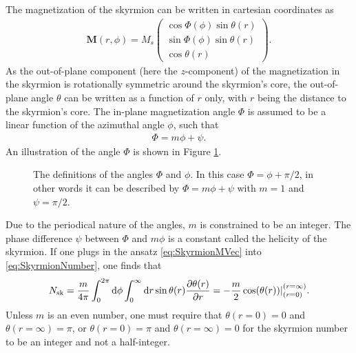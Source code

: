 The magnetization of the skyrmion can be written in cartesian coordinates as
\begin{align}
\label{eq:SkyrmionMVec}
\mathbold{M}(r, \phi) = M_s
\begin{pmatrix}
\cos\Phi(\phi)\sin\theta(r) \\ \sin\Phi(\phi)\sin\theta(r) \\ \cos\theta(r)
\end{pmatrix}.
\end{align}
As the out-of-plane component (here the $z$-component) of the magnetization in the skyrmion is rotationally symmetric around the skyrmion's core, the out-of-plane angle $\theta$ can be written as a function of $r$ only, with $r$ being the distance to the skyrmion's core. The in-plane magnetization angle $\Phi$ is assumed to be a linear function of the azimuthal angle $\phi$, such that
\begin{align}
\Phi = m\phi + \psi.
\end{align}
An illustration of the angle $\Phi$ is shown in Figure \ref{fig:PhiFig}.
\begin{figure}[h!]
\centering
  \centering
\caption{The definitions of the angles $\Phi$ and $\phi$. In this case $\Phi = \phi+\pi/2$, in other words it can be described by $\Phi =m\phi+\psi$ with $m=1$ and $\psi=\pi/2$.}
\label{fig:PhiFig}
\end{figure}
Due to the periodical nature of the angles, $m$ is constrained to be an integer. The phase difference $\psi$ between $\Phi$ and $m\phi$ is a constant called the helicity of the skyrmion. If one plugs in the ansatz \eqref{eq:SkyrmionMVec} into \eqref{eq:SkyrmionNumber}, one finds that
\begin{align}
N_{\textrm{sk}} = \frac{m}{4\pi}\int_0^{2\pi}\operatorname{d}\!{\phi} \int_0^{\infty}\operatorname{d}\!{r} \sin\theta(r) \frac{\partial\theta(r)}{\partial r} = - \frac{m}{2} \cos(\theta(r))|_{(r = 0)}^{(r=\infty)}.
\end{align}
Unless $m$ is an even number, one must require that $\theta(r = 0) = 0$ and $\theta(r = \infty) = \pi$, or $\theta(r = 0) = \pi$ and $\theta(r = \infty) = 0$ for the skyrmion number to be an integer and not a half-integer.

